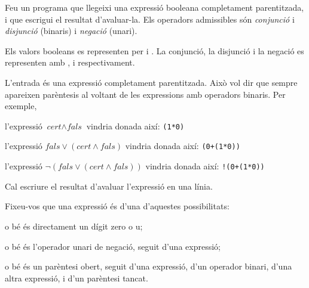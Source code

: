 \newcommand{\cert}{\textit{cert}}
\newcommand{\fals}{\textit{fals}}


\Statement

Feu un programa que llegeixi una expressió booleana completament parentitzada,
i que escrigui el resultat d'avaluar-la.
Els operadors admissibles són \emph{conjunció} i \emph{disjunció}
(binaris) i \emph{negació} (unari).


\Input


Els valors booleans es representen per  i .
La conjunció, la disjunció i la negació es representen amb
 \q{*}, \q{+} i \q{!} respectivament.

\medskip

L'entrada és una expressió completament parentitzada.
Això vol dir que sempre apareixen parèntesis
al voltant de les expressions amb operadors binaris.
Per exemple,
\begin{itemize*}

    \item l'expressió $\cert \land \fals$ vindria donada així: \texttt{(1*0)}
    \item l'expressió $\fals \lor (\cert \land \fals)$ vindria donada així: \texttt{(0+(1*0))}
    \item l'expressió $\lnot(\fals \lor (\cert \land \fals))$ vindria donada així: \texttt{!(0+(1*0))}

\end{itemize*}


\Output

Cal escriure el resultat d'avaluar l'expressió en una línia.


\Hint

Fixeu-vos que una expressió és d'una d'aquestes possibilitats:
\begin{itemize*}
\item o bé és directament un dígit zero o u;
\item o bé és l'operador unari de negació, seguit d'una expressió;
\item o bé és un parèntesi obert, seguit d'una expressió, d'un operador binari,
d'una altra expressió, i d'un parèntesi tancat.
\end{itemize*}

\Sample


